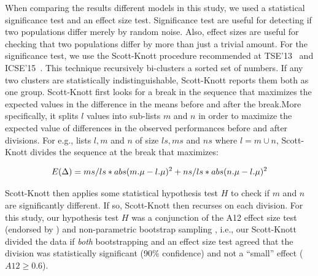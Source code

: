 \documentclass[10pt,journal,compsoc]{IEEEtran}
\begin{document}
When comparing the results different models in this study, we used a statistical significance test and an effect size test. Significance test are useful for detecting if two populations
differ merely by random noise. Also, effect sizes are useful for checking that two populations differ by more than just a trivial amount. For the significance test,  we use the Scott-Knott procedure  recommended at TSE'13~\cite{mittas2013ranking} and ICSE'15~\cite{ghotra2015revisiting}. This technique recursively bi-clusters a sorted set of numbers. If any two clusters are statistically indistinguishable, Scott-Knott reports them both as one group. Scott-Knott first looks for a break in the sequence that maximizes the expected values in the difference in the means before and after the break.More specifically,  it  splits $l$ values into sub-lists $m$ and $n$ in order to maximize the expected value of differences  in the observed performances before and after divisions. For e.g., lists $l,m$ and $n$ of size $ls,ms$ and $ns$ where $l=m\cup n$, Scott-Knott divides the sequence at the break that maximizes:

\begin{equation}
    E(\Delta)=ms/ls*abs(m.\mu - l.\mu)^2 \\ + ns/ls*abs(n.\mu - l.\mu)^2
\end{equation}

Scott-Knott then applies some statistical hypothesis test $H$ to check if $m$ and $n$ are significantly different. If so, Scott-Knott then recurses on each division. For this study, our hypothesis test $H$ was a conjunction of the A12 effect size test (endorsed by \cite{arcuri2011practical})  and non-parametric bootstrap sampling \cite{efron94}, i.e., our Scott-Knott divided the data if {\em both} bootstrapping and an effect size test agreed that the division was statistically significant (90\% confidence) and not a ``small'' effect ($A12 \ge 0.6$).
\end{document}
